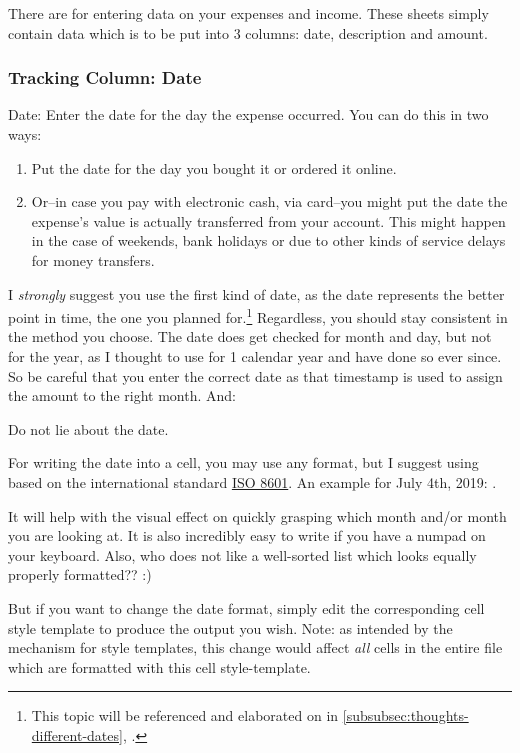 There are  for entering data on your expenses and income.
These sheets simply contain data which is to be put into 3 columns: date, description and amount.

\subsubsection{Tracking Column: Date}
\label{subsec:tracking-column-date}

Date: Enter the date for the day the expense occurred.
You can do this in two ways:
\begin{enumerate}
	\item Put the date for the day you bought it or ordered it online.
	\item Or--in case you pay with electronic cash, \eg via card--you might put the date the expense's value is actually transferred from your account.
	This might happen in the case of weekends, bank holidays or due to other kinds of service delays for money transfers.
\end{enumerate}
I \emph{strongly} suggest you use the first kind of date, as the date represents the better point in time, \ie the one you planned for.\footnote{This topic will be referenced and elaborated on in \autoref{subsubsec:thoughts-different-dates}, .}
Regardless, you should stay consistent in the method you choose.
The date does get checked for month and day, but not for the year, as I thought to use \tfn for 1 calendar year and have done so ever since.
So be careful that you enter the correct date as that timestamp is used to assign the amount to the right month.
And:
\begin{specialnote}
	Do not lie about the date.
\end{specialnote}

For writing the date into a cell, you may use any format, but I suggest using  based on the international standard \href{https://en.wikipedia.org/wiki/ISO_8601}{ISO 8601}.
An example for July 4th, 2019: .

It will help with the visual effect on quickly grasping which month and/or month you are looking at.
It is also incredibly easy to write if you have a numpad on your keyboard.
Also, who does not like a well-sorted list which looks equally properly formatted?? :)

But if you want to change the date format, simply edit the corresponding cell style template to produce the output you wish.
Note: as intended by the mechanism for style templates, this change would affect \emph{all} cells in the entire file which are formatted with this cell style-template.

